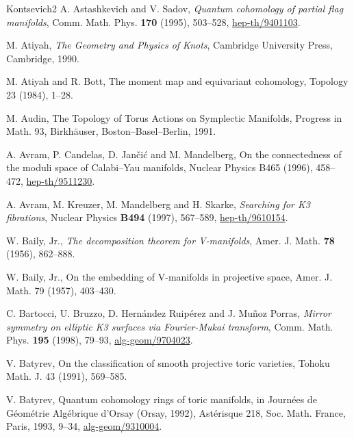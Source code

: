 \begin{thebibliography}{Kontsevich2}
\hypertarget{bib:AS}{} A. Astashkevich and V. Sadov, \emph{Quantum cohomology of partial flag manifolds}, Comm. Math. Phys. \textbf{170} (1995), 503--528, \href{https://arxiv.org/abs/hep-th/9401103}{hep-th/9401103}.

\hypertarget{bib:Atiyah}{} M. Atiyah, \emph{The Geometry and Physics of Knots}, Cambridge University Press, Cambridge, 1990.

\hypertarget{bib:AB}{}
M. Atiyah and R. Bott, The moment map and equivariant cohomology, Topology 23 (1984), 1--28.

\hypertarget{bib:Audin}{}
M. Audin, The Topology of Torus Actions on Symplectic Manifolds,
Progress in Math. 93, Birkhäuser, Boston--Basel--Berlin, 1991.

\hypertarget{bib:ACJM}{}
A. Avram, P. Candelas, D. Jančić and M. Mandelberg, On the connectedness of the moduli space of Calabi--Yau manifolds, Nuclear Physics B465 (1996), 458--472, \href{https://arxiv.org/abs/hep-th/9511230}{hep-th/9511230}.

\hypertarget{bib:AKMS}{} A. Avram, M. Kreuzer, M. Mandelberg and H. Skarke, \emph{Searching for K3 fibrations}, Nuclear Physics \textbf{B494} (1997), 567--589, \href{https://arxiv.org/abs/hep-th/9610154}{hep-th/9610154}.

\hypertarget{bib:Baily1}{} W. Baily, Jr., \emph{The decomposition theorem for V-manifolds}, Amer. J. Math. \textbf{78} (1956), 862--888.

\hypertarget{bib:Baily2}{}
W. Baily, Jr., On the embedding of V-manifolds in projective space,
Amer. J. Math. 79 (1957), 403--430.

\hypertarget{bib:BBRP}{} C. Bartocci, U. Bruzzo, D. Hernández Ruipérez and J. Muñoz Porras, \emph{Mirror symmetry on elliptic K3 surfaces via Fourier-Mukai transform}, Comm. Math. Phys. \textbf{195} (1998), 79--93, \href{https://arxiv.org/abs/alg-geom/9704023}{alg-geom/9704023}.

\hypertarget{bib:Batyrev1}{}
V. Batyrev, On the classification of smooth projective toric varieties,
Tohoku Math. J. 43 (1991), 569--585.

\hypertarget{bib:Batyrev2}{}
V. Batyrev, Quantum cohomology rings of toric manifolds,
in Journées de Géométrie Algébrique d'Orsay (Orsay, 1992),
Astérisque 218, Soc. Math. France, Paris, 1993, 9--34,
\href{https://arxiv.org/abs/alg-geom/9310004}{alg-geom/9310004}.


\end{thebibliography}
